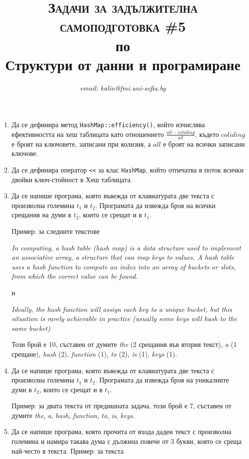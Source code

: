 \documentclass[12pt,a4paper]{article}
\author{\textit{email: kalin@fmi.uni-sofia.bg}}
\title{\textsc{Задачи за задължителна самоподготовка \#5} \\
по \\
Структури от данни и програмиране}
\begin{document}
\maketitle


\begin{enumerate}

	\item Да се дефинира метод \texttt{HashMap::efficiency()}, който изчислява ефективността на хеш таблицата като отношението  $\frac{all-coliding}{all}$, където $coliding$ е броят на ключовете, записани при колизия, а $all$ е броят на всички записани ключове.


	\item Да се дефинира оператор \texttt{<}\texttt{<} за клас \texttt{HashMap}, който отпечатва в поток всички двойки ключ-стойност в Хеш таблицата.

	\item Да се напише програма, която въвежда от клавиатурата две текста с произволна големина $t_1$ и $t_2$. Програмата да извежда броя на всички срещания на думи в $t_2$, които се срещат и в $t_1$.

	Пример: за следните текстове

	\textit{In computing, a hash table (hash map) is a data structure used to implement an associative array, a structure that can map keys to values. A hash table uses a hash function to compute an index into an array of buckets or slots, from which the correct value can be found.}

	и 

	\textit{Ideally, the hash function will assign each key to a unique bucket, but this situation is rarely achievable in practice (usually some keys will hash to the same bucket)}

	Този брой е 10, съставен от думите \textit {the} (2 срещания във втория текст), \textit{a} (1 срещане), \textit{hash} (2), \textit {function} (1), \textit{to} (2), \textit{is} (1), \textit{keys} (1).


	\item Да се напише програма, която въвежда от клавиатурата две текста с произволна големина $t_1$ и $t_2$. Програмата да извежда броя на уникалните думи в $t_2$, които се срещат и в $t_1$.

	Пример: за двата текста от предишната задача, този брой е 7, съставен от думите \textit {the}, \textit{a}, \textit{hash}, \textit {function}, \textit{to}, \textit{is}, \textit{keys}.


	\item Да се напише програма, която прочита от входа даден текст с произволна големина и намира такава дума с дължина повече от 3 букви, която се среща най-често в текста. Пример: за текста


\end{enumerate}
\end{document}

